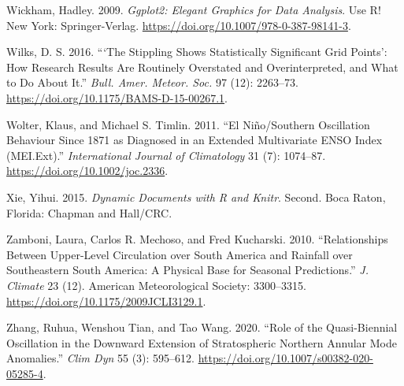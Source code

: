 \documentclass[smallextended]{svjour3}       %
\begin{document}
\leavevmode\hypertarget{ref-wickham2009}{}%
Wickham, Hadley. 2009. \emph{Ggplot2: Elegant Graphics for Data Analysis}. Use R! New York: Springer-Verlag. \url{https://doi.org/10.1007/978-0-387-98141-3}.

\leavevmode\hypertarget{ref-wilks2016}{}%
Wilks, D. S. 2016. ```The Stippling Shows Statistically Significant Grid Points': How Research Results Are Routinely Overstated and Overinterpreted, and What to Do About It.'' \emph{Bull. Amer. Meteor. Soc.} 97 (12): 2263--73. \url{https://doi.org/10.1175/BAMS-D-15-00267.1}.

\leavevmode\hypertarget{ref-wolter2011}{}%
Wolter, Klaus, and Michael S. Timlin. 2011. ``El Niño/Southern Oscillation Behaviour Since 1871 as Diagnosed in an Extended Multivariate ENSO Index (MEI.Ext).'' \emph{International Journal of Climatology} 31 (7): 1074--87. \url{https://doi.org/10.1002/joc.2336}.

\leavevmode\hypertarget{ref-xie2015}{}%
Xie, Yihui. 2015. \emph{Dynamic Documents with R and Knitr}. Second. Boca Raton, Florida: Chapman and Hall/CRC.

\leavevmode\hypertarget{ref-zamboni2010}{}%
Zamboni, Laura, Carlos R. Mechoso, and Fred Kucharski. 2010. ``Relationships Between Upper-Level Circulation over South America and Rainfall over Southeastern South America: A Physical Base for Seasonal Predictions.'' \emph{J. Climate} 23 (12). American Meteorological Society: 3300--3315. \url{https://doi.org/10.1175/2009JCLI3129.1}.

\leavevmode\hypertarget{ref-zhang2020}{}%
Zhang, Ruhua, Wenshou Tian, and Tao Wang. 2020. ``Role of the Quasi-Biennial Oscillation in the Downward Extension of Stratospheric Northern Annular Mode Anomalies.'' \emph{Clim Dyn} 55 (3): 595--612. \url{https://doi.org/10.1007/s00382-020-05285-4}.



\end{document}
